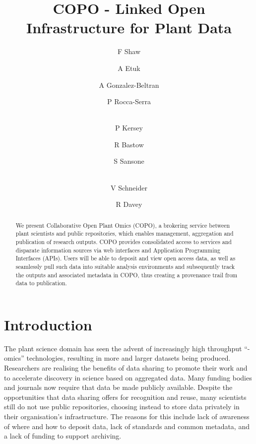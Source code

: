 \documentclass[runningheads,a4paper]{llncs}
\begin{document}
\title{COPO - Linked Open Infrastructure for Plant Data}

\author{F Shaw  \and A Etuk  \and A Gonzalez-Beltran
  \and P Rocca-Serra \and\\
  P  Kersey \and R Bastow  \and S Sansone \and\\
  V Schneider \and R Davey }
%


\maketitle

\vspace*{-0.2in}
\begin{abstract}
  We present Collaborative Open Plant Omics (COPO), a brokering
  service between plant scientists and public repositories, which
  enables management, aggregation and publication of research
  outputs. COPO provides consolidated access to services and disparate
  information sources via web interfaces and Application Programming
  Interfaces (APIs). Users will be able to deposit and view open
  access data, as well as seamlessly pull such data into suitable
  analysis environments and subsequently track the outputs and
  associated metadata in COPO, thus creating a provenance trail from
  data to publication.
\end{abstract}

\vspace*{-0.3in}
\section{Introduction}
\vspace*{-0.1in} The plant science domain has seen the advent of
increasingly high throughput ``-omics'' technologies, resulting in
more and larger datasets being produced. Researchers are realising the
benefits of data sharing to promote their work and to accelerate
discovery in science based on aggregated data. Many funding bodies and
journals now require that data be made publicly available. Despite the
opportunities that data sharing offers for recognition and reuse, many
scientists still do not use public repositories, choosing instead to
store data privately in their organisation's infrastructure. The
reasons for this include lack of awareness of where and how to deposit
data, lack of standards and common metadata, and a lack of funding to
support archiving.
\end{document}
